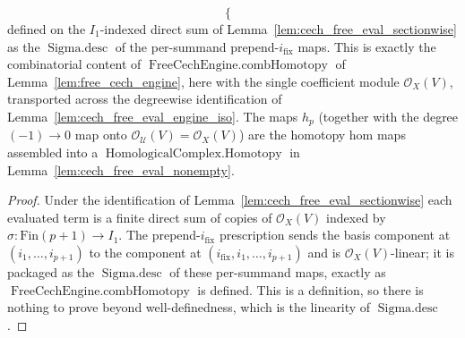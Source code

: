 \begin{lemma}
\[\begin{cases}
      \end{cases}
  \]
  defined on the \(I_1\)-indexed direct sum of
  Lemma~\ref{lem:cech_free_eval_sectionwise} as the \(\operatorname{Sigma.desc}\) of
  the per-summand prepend-\(i_{\mathrm{fix}}\) maps. This is exactly the
  combinatorial content of \(\operatorname{FreeCechEngine.combHomotopy}\) of
  Lemma~\ref{lem:free_cech_engine}, here with the single
  coefficient module \(\mathcal{O}_X(V)\), transported across the degreewise
  identification of Lemma~\ref{lem:cech_free_eval_engine_iso}. The maps \(h_p\) (together with the
  degree \((-1)\!\to\!0\) map onto \(\mathcal{O}_{\mathcal{U}}(V) = \mathcal{O}_X(V)\))
  are the homotopy hom maps assembled into a
  \(\operatorname{HomologicalComplex.Homotopy}\) in
  Lemma~\ref{lem:cech_free_eval_nonempty}.
\end{lemma}

\begin{proof}
  Under the identification of Lemma~\ref{lem:cech_free_eval_sectionwise} each
  evaluated term is a finite direct sum of copies of \(\mathcal{O}_X(V)\) indexed by
  \(\sigma : \mathrm{Fin}(p+1) \to I_1\). The prepend-\(i_{\mathrm{fix}}\) prescription
  sends the basis component at \((i_1, \ldots, i_{p+1})\) to the component at
  \((i_{\mathrm{fix}}, i_1, \ldots, i_{p+1})\) and is \(\mathcal{O}_X(V)\)-linear; it is
  packaged as the \(\operatorname{Sigma.desc}\) of these per-summand maps, exactly as
  \(\operatorname{FreeCechEngine.combHomotopy}\) is defined. This is a definition,
  so there is nothing to prove beyond well-definedness, which is the linearity of
  \(\operatorname{Sigma.desc}\).
\end{proof}

